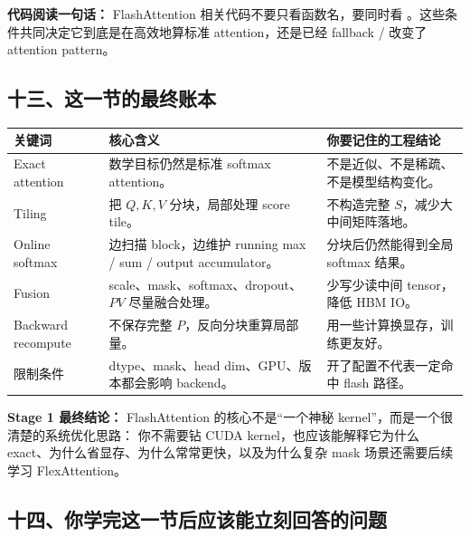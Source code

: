 \begin{conceptbox}
\textbf{代码阅读一句话：} FlashAttention 相关代码不要只看函数名，要同时看 。这些条件共同决定它到底是在高效地算标准 attention，还是已经 fallback / 改变了 attention pattern。
\end{conceptbox}

\subsection{十三、这一节的最终账本}

\begin{center}
{\small
\begin{tabular}{p{3.0cm}p{4.7cm}p{5.0cm}}
\hline
\textbf{关键词} & \textbf{核心含义} & \textbf{你要记住的工程结论} \\
\hline
Exact attention & 数学目标仍然是标准 softmax attention。 & 不是近似、不是稀疏、不是模型结构变化。 \\
Tiling & 把 $Q,K,V$ 分块，局部处理 score tile。 & 不构造完整 $S$，减少大中间矩阵落地。 \\
Online softmax & 边扫描 block，边维护 running max / sum / output accumulator。 & 分块后仍然能得到全局 softmax 结果。 \\
Fusion & scale、mask、softmax、dropout、$PV$ 尽量融合处理。 & 少写少读中间 tensor，降低 HBM IO。 \\
Backward recompute & 不保存完整 $P$，反向分块重算局部量。 & 用一些计算换显存，训练更友好。 \\
限制条件 & dtype、mask、head dim、GPU、版本都会影响 backend。 & 开了配置不代表一定命中 flash 路径。 \\
\hline
\end{tabular}
}
\end{center}

\begin{summarybox}
\textbf{Stage 1 最终结论：} FlashAttention 的核心不是“一个神秘 kernel”，而是一个很清楚的系统优化思路： 你不需要钻 CUDA kernel，也应该能解释它为什么 exact、为什么省显存、为什么常常更快，以及为什么复杂 mask 场景还需要后续学习 FlexAttention。
\end{summarybox}

\subsection{十四、你学完这一节后应该能立刻回答的问题}

